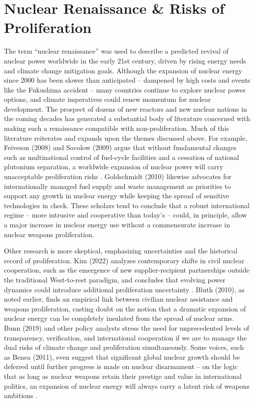\documentclass[11,5 pt]{article}
\begin{document}
\section{Nuclear Renaissance \& Risks of Proliferation}


The term “nuclear renaissance” was used to describe a predicted revival of nuclear power worldwide in the early 21st century, driven by rising energy needs and climate change mitigation goals. Although the expansion of nuclear energy since 2000 has been slower than anticipated – dampened by high costs and events like the Fukushima accident – many countries continue to explore nuclear power options, and climate imperatives could renew momentum for nuclear development. The prospect of dozens of new reactors and new nuclear nations in the coming decades has generated a substantial body of literature concerned with making such a renaissance compatible with non-proliferation. Much of this literature reiterates and expands upon the themes discussed above. For example, Feiveson (2008) and Socolow (2009) argue that without fundamental changes such as multinational control of fuel-cycle facilities and a cessation of national plutonium separation, a worldwide expansion of nuclear power will carry unacceptable proliferation risks \cite{10.2307/resrep05034} \cite{10.2307/40543999}. Goldschmidt (2010) likewise advocates for internationally managed fuel supply and waste management as priorities to support any growth in nuclear energy while keeping the spread of sensitive technologies in check. These scholars tend to conclude that a robust international regime – more intrusive and cooperative than today’s – could, in principle, allow a major increase in nuclear energy use without a commensurate increase in nuclear weapons proliferation.

Other research is more skeptical, emphasizing uncertainties and the historical record of proliferation. Kim (2022) analyzes contemporary shifts in civil nuclear cooperation, such as the emergence of new supplier-recipient partnerships outside the traditional West-to-rest paradigm, and concludes that evolving power dynamics could introduce additional proliferation uncertainty \cite{KIM2022112852}. Bluth (2010), as noted earlier, finds an empirical link between civilian nuclear assistance and weapons proliferation, casting doubt on the notion that a dramatic expansion of nuclear energy can be completely insulated from the spread of nuclear arms. Bunn (2019) and other policy analysts stress the need for unprecedented levels of transparency, verification, and international cooperation if we are to manage the dual risks of climate change and proliferation simultaneously. Some voices, such as Benea (2011), even suggest that significant global nuclear growth should be deferred until further progress is made on nuclear disarmament – on the logic that as long as nuclear weapons retain their prestige and value in international politics, an expansion of nuclear energy will always carry a latent risk of weapons ambitions \cite{benea2011atom}. 
\end{document}
